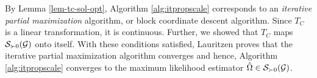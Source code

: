 By Lemma \ref{lem-tc-sol-opt}, Algorithm \ref{alg:itpropscale} corresponds to an \textit{iterative partial maximization} algorithm, or block coordinate descent algorithm. Since $T_C$ is a linear transformation, it is continuous. Further, we showed that $T_C$ maps ${\mathcal{S}}_{\succ 0}({\mathcal{G}})$ onto itself. With these conditions satisfied, Lauritzen \cite[Proposition A.3]{lauritzen1996} proves that the iterative partial maximization algorithm converges and hence, Algorithm \ref{alg:itpropscale} converges to the maximum likelihood estimator $\hat\Omega \in {\mathcal{S}}_{\succ 0}({\mathcal{G}})$.